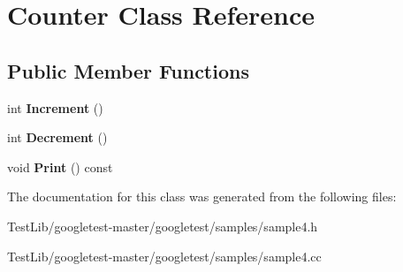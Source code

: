 \hypertarget{classCounter}{}\section{Counter Class Reference}
\label{classCounter}
\subsection*{Public Member Functions}
\begin{DoxyCompactItemize}
\item 
\mbox{\label{classCounter_a0a0ca9fdb580a2aec9a5a62ebed2b5ab}} 
int {\bfseries Increment} ()
\item 
\mbox{\label{classCounter_aa58d9b4f0bd96fc2331234493eb21bed}} 
int {\bfseries Decrement} ()
\item 
\mbox{\label{classCounter_a80092ec2a0deea0870b2e9f8ad0906bd}} 
void {\bfseries Print} () const
\end{DoxyCompactItemize}


The documentation for this class was generated from the following files\+:\begin{DoxyCompactItemize}
\item 
Test\+Lib/googletest-\/master/googletest/samples/sample4.\+h\item 
Test\+Lib/googletest-\/master/googletest/samples/sample4.\+cc\end{DoxyCompactItemize}
